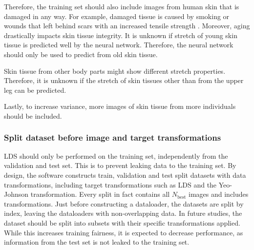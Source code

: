 Therefore, the training set should also include images from human skin that is damaged in any way.
For example, damaged tissue is caused by smoking \cite{Lipa2021} or wounds that left behind scars with an increased tensile strength \cite{Wilkinson2020}.
Moreover, aging drastically impacts skin tissue integrity.
It is unknown if stretch of young skin tissue is predicted well by the neural network.
Therefore, the neural network should only be used to predict from old skin tissue.

Skin tissue from other body parts might show different stretch properties.
Therefore, it is unknown if the stretch of skin tissues other than from the upper leg can be predicted.

Lastly, to increase variance, more images of skin tissue from more individuals should be included.

\subsubsection{Split dataset before image and target transformations}
LDS should only be performed on the training set, independently from the validation and test set.
This is to prevent leaking data to the training set.
By design, the software constructs train, validation and test split datasets with data transformations, including target transformations such as LDS and the Yeo-Johnson transformation.
Every split in fact contains all $N_\mathrm{best}$ images and includes transformations.
Just before constructing a dataloader, the datasets are split by index, leaving the dataloaders with non-overlapping data.
In future studies, the dataset should be split into subsets with their specific transformations applied.
While this increases training fairness, it is expected to decrease performance, as information from the test set is not leaked to the training set.

